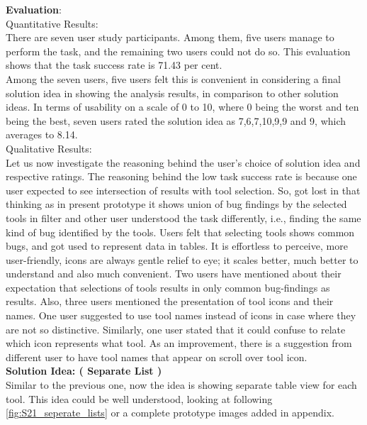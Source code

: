\textbf{Evaluation}: \\

Quantitative Results: \\

There are seven user study participants. Among them, five users manage to perform the task, and the remaining two users could not do so. This evaluation shows that the task success rate is 71.43 per cent. \\

Among the seven users, five users felt this is convenient in considering a final solution idea in showing the analysis results, in comparison to other solution ideas. In terms of usability on a scale of 0 to 10, where 0 being the worst and ten being the best, seven users rated the solution idea as 7,6,7,10,9,9 and 9, which averages to 8.14. \\

Qualitative Results: \\

Let us now investigate the reasoning behind the user’s choice of solution idea and respective ratings. The reasoning behind the low task success rate is because one user expected to see intersection of results with tool selection. So, got lost in that thinking as in present prototype it shows union of bug findings by the selected tools in filter and other user understood the task differently, i.e., finding the same kind of bug identified by the tools.  Users felt that selecting tools shows common bugs, and got used to represent data in tables. It is effortless to perceive, more user-friendly, icons are always gentle relief to eye; it scales better, much better to understand and also much convenient. Two users have mentioned about their expectation that selections of tools results in only common bug-findings as results. Also, three users mentioned the presentation of tool icons and their names. One user suggested to use tool names instead of icons in case where they are not so distinctive. Similarly, one user stated that it could confuse to relate which icon represents what tool. As an improvement, there is a suggestion from different user to have tool names that appear on scroll over tool icon. \\

\textbf{Solution Idea: ( Separate List )} \\

Similar to the previous one, now the idea is showing separate table view for each tool. This idea could be well understood, looking at following \autoref{fig:S21_seperate_lists} or a complete prototype images added in appendix.  \\


